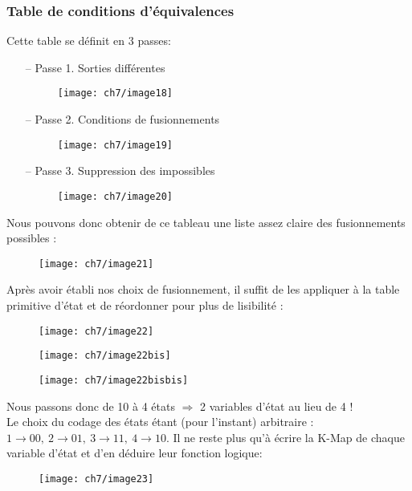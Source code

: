 \subsubsection{Table de conditions d'équivalences}
Cette table se définit en 3 passes:
\begin{enumerate}
	\item[-- Passe 1.] Sorties différentes
	\begin{figure}[H]
		\centering
		\texttt{[image: ch7/image18]}
	\end{figure}
	\item[-- Passe 2.] Conditions de fusionnements 
	\begin{figure}[H]
		\centering
		\texttt{[image: ch7/image19]}
	\end{figure}
	\item[-- Passe 3.] Suppression des impossibles
	\begin{figure}[H]
		\centering
		\texttt{[image: ch7/image20]}
	\end{figure}
\end{enumerate}
Nous pouvons donc obtenir de ce tableau une liste assez claire des fusionnements possibles :
\begin{figure}[H]
	\centering
	\texttt{[image: ch7/image21]}
\end{figure}
Après avoir établi nos choix de fusionnement, il suffit de les appliquer à la table primitive d'état et de réordonner pour plus de lisibilité :
\begin{figure}[H]
	\centering
	\texttt{[image: ch7/image22]}
\end{figure}
\begin{figure}[H]
	\centering
	\texttt{[image: ch7/image22bis]}
\end{figure}
\begin{figure}[H]
	\centering
	\texttt{[image: ch7/image22bisbis]}
\end{figure}

Nous passons donc de 10 à 4 états $\Rightarrow$ 2 variables d'état au lieu de 4 !\\

Le choix du codage des états étant (pour l'instant) arbitraire : $1\rightarrow 00,\ 2\rightarrow 01,\ 3\rightarrow 11,\ 4\rightarrow 10$. Il ne reste plus qu'à écrire la K-Map de chaque variable d'état et d'en déduire leur fonction logique:
 \begin{figure}[H]
 	\centering
 	\texttt{[image: ch7/image23]}
 \end{figure}
